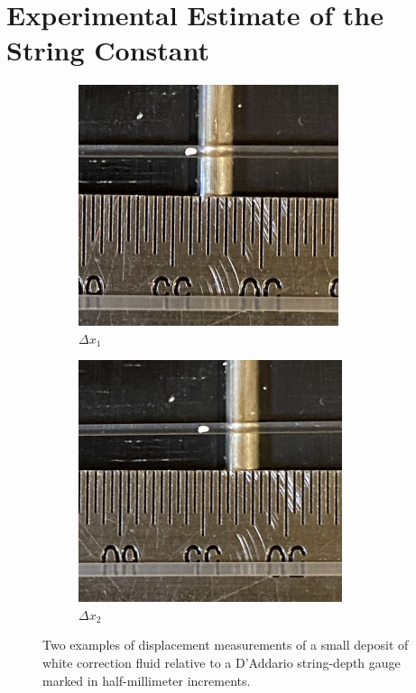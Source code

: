 %
%
%

 \section{Experimental Estimate of the String Constant\label{sct:exp}}

 \begin{figure}
  \centering
  \begin{subfigure}[b]{0.45\textwidth}
      \centering
      \includegraphics[width=3.0in]{figures/exp_dx1.jpg}
      \caption{$\Delta x_1$}
      \label{fig:exp_dx1}
  \end{subfigure}
  \hspace{0.25in}
  \begin{subfigure}[b]{0.45\textwidth}
      \centering
      \includegraphics[width=3.04in]{figures/exp_dx2.jpg}
      \caption{$\Delta x_2$}
      \label{fig:exp_dx2}
  \end{subfigure}
  \caption{\label{fig:exp_dx} Two examples of displacement measurements of a small deposit of white correction fluid relative to a D'Addario string-depth gauge marked in half-millimeter increments.}
\end{figure}


